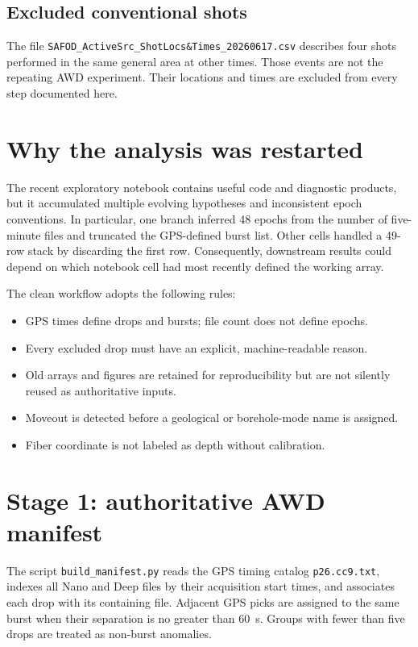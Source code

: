 \documentclass[11pt]{article}
\newcommand{\code}[1]{\texttt{#1}}
\begin{document}
\subsection{Excluded conventional shots}

The file \code{SAFOD\_ActiveSrc\_ShotLocs\&Times\_20260617.csv} describes four
shots performed in the same general area at other times.  Those events are
not the repeating AWD experiment.  Their locations and times are excluded
from every step documented here.

\section{Why the analysis was restarted}

The recent exploratory notebook contains useful code and diagnostic products,
but it accumulated multiple evolving hypotheses and inconsistent epoch
conventions.  In particular, one branch inferred 48 epochs from the number of
five-minute files and truncated the GPS-defined burst list.  Other cells
handled a 49-row stack by discarding the first row.  Consequently, downstream
results could depend on which notebook cell had most recently defined the
working array.

The clean workflow adopts the following rules:

\begin{itemize}
    \item GPS times define drops and bursts; file count does not define epochs.
    \item Every excluded drop must have an explicit, machine-readable reason.
    \item Old arrays and figures are retained for reproducibility but are not
          silently reused as authoritative inputs.
    \item Moveout is detected before a geological or borehole-mode name is
          assigned.
    \item Fiber coordinate is not labeled as depth without calibration.
\end{itemize}

\section{Stage 1: authoritative AWD manifest}

The script \code{build\_manifest.py} reads the GPS timing catalog
\code{p26.cc9.txt}, indexes all Nano and Deep files by their acquisition start
times, and associates each drop with its containing file.  Adjacent GPS picks
are assigned to the same burst when their separation is no greater than 60~s.
Groups with fewer than five drops are treated as non-burst anomalies.
\end{document}
